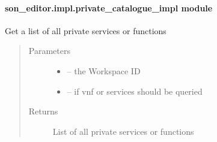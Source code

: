 \documentclass[letterpaper,10pt,english]{sphinxmanual}
\begin{document}
\paragraph{son\_editor.impl.private\_catalogue\_impl module}
\label{_source/son_editor.impl:module-son_editor.impl.private_catalogue_impl}\label{_source/son_editor.impl:son-editor-impl-private-catalogue-impl-module}

\begin{fulllineitems}
\label{_source/son_editor.impl:son_editor.impl.private_catalogue_impl.get_private_nsfs_list}
Get a list of all private services or functions
\begin{quote}\begin{description}
\item[{Parameters}] \leavevmode\begin{itemize}
\item {} 
 -- the Workspace ID

\item {} 
 -- if vnf or services should be queried

\end{itemize}

\item[{Returns}] \leavevmode
List of all private services or functions

\end{description}\end{quote}

\end{fulllineitems}

\end{document}
